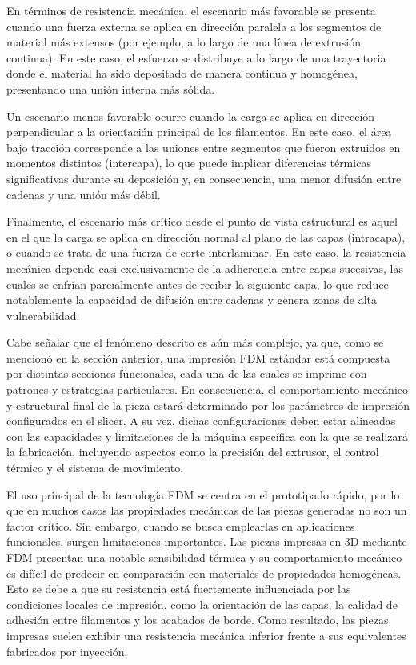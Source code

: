 En términos de resistencia mecánica, el escenario más favorable se presenta cuando una fuerza externa se aplica en dirección paralela a los segmentos de material más extensos (por ejemplo, a lo largo de una línea de extrusión continua). En este caso, el esfuerzo se distribuye a lo largo de una trayectoria donde el material ha sido depositado de manera continua y homogénea, presentando una unión interna más sólida.

Un escenario menos favorable ocurre cuando la carga se aplica en dirección perpendicular a la orientación principal de los filamentos. En este caso, el área bajo tracción corresponde a las uniones entre segmentos que fueron extruidos en momentos distintos (intercapa), lo que puede implicar diferencias térmicas significativas durante su deposición y, en consecuencia, una menor difusión entre cadenas y una unión más débil.

Finalmente, el escenario más crítico desde el punto de vista estructural es aquel en el que la carga se aplica en dirección normal al plano de las capas (intracapa), o cuando se trata de una fuerza de corte interlaminar. En este caso, la resistencia mecánica depende casi exclusivamente de la adherencia entre capas sucesivas, las cuales se enfrían parcialmente antes de recibir la siguiente capa, lo que reduce notablemente la capacidad de difusión entre cadenas y genera zonas de alta vulnerabilidad.

Cabe señalar que el fenómeno descrito es aún más complejo, ya que, como se mencionó en la sección anterior, una impresión FDM estándar está compuesta por distintas secciones funcionales, cada una de las cuales se imprime con patrones y estrategias particulares. En consecuencia, el comportamiento mecánico y estructural final de la pieza estará determinado por los parámetros de impresión configurados en el slicer. A su vez, dichas configuraciones deben estar alineadas con las capacidades y limitaciones de la máquina específica con la que se realizará la fabricación, incluyendo aspectos como la precisión del extrusor, el control térmico y el sistema de movimiento.

El uso principal de la tecnología FDM se centra en el prototipado rápido, por lo que en muchos casos las propiedades mecánicas de las piezas generadas no son un factor crítico. Sin embargo, cuando se busca emplearlas en aplicaciones funcionales, surgen limitaciones importantes. Las piezas impresas en 3D mediante FDM presentan una notable sensibilidad térmica y su comportamiento mecánico es difícil de predecir en comparación con materiales de propiedades homogéneas. Esto se debe a que su resistencia está fuertemente influenciada por las condiciones locales de impresión, como la orientación de las capas, la calidad de adhesión entre filamentos y los acabados de borde. Como resultado, las piezas impresas suelen exhibir una resistencia mecánica inferior frente a sus equivalentes fabricados por inyección.

